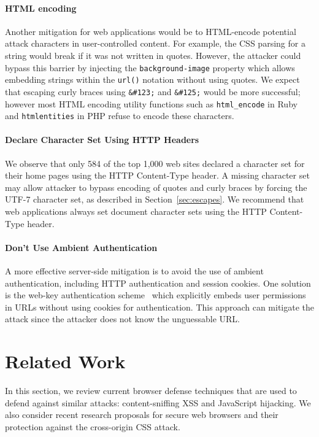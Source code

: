 \documentclass{acm_proc_article-sp}
\begin{document}
\paragraph{HTML encoding}
Another mitigation for web applications would be to HTML-encode potential attack characters in user-controlled content. For example, the CSS parsing for a string would break if it was not written in quotes. However, the attacker could bypass this barrier by injecting the \texttt{background-image} property which allows embedding strings within the \texttt{url()} notation without using quotes. We expect that escaping curly braces using \verb|&#123;| and \verb|&#125;| would be more successful; however most HTML encoding utility functions such as \verb|html_encode| in Ruby and \verb|htmlentities| in PHP refuse to encode these characters.

\paragraph{Declare Character Set Using HTTP Headers}
We observe that only 584 of the top 1,000 web sites declared a character set
for their home pages using the HTTP Content-Type header. A missing character set
may allow attacker to bypass encoding of quotes and curly braces by forcing
the UTF-7 character set, as described in Section~\ref{sec:escapes}. We
recommend that web applications always set document character sets using the HTTP Content-Type header.

\paragraph{Don't Use Ambient Authentication}
A more effective server-side mitigation is to avoid the use of ambient authentication, including HTTP authentication and session cookies. One solution is the web-key authentication scheme~\cite{webkey} which explicitly embeds user permissions in URLs without using cookies for authentication. This approach can mitigate the attack since the attacker does not know the unguessable URL.

\section{Related Work} \label{sec:relatedwork}
In this section, we review current browser defense techniques that are used to
defend against similar attacks: content-sniffing XSS and JavaScript hijacking.
We also consider recent research proposals for secure web browsers and their
protection against the cross-origin CSS attack.
\end{document}
